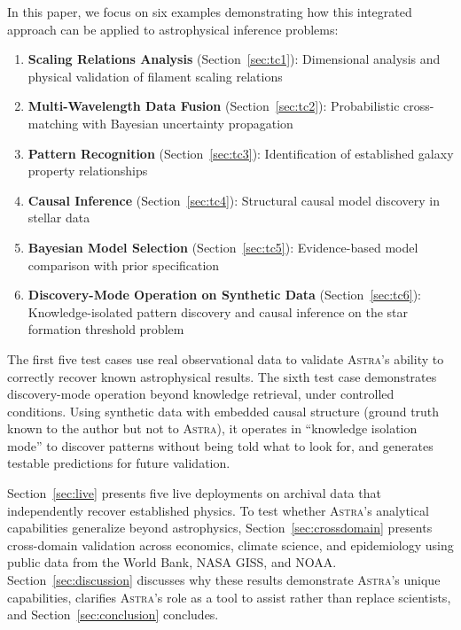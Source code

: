 \documentclass[usenatbib]{rasti}
\newcommand{\astra}{\textsc{Astra}\xspace}
\begin{document}
In this paper, we focus on six examples demonstrating how this integrated approach can be applied to astrophysical inference problems:
\begin{enumerate}
  \item[(i)] \textbf{Scaling Relations Analysis} (Section~\ref{sec:tc1}): Dimensional analysis and physical validation of filament scaling relations
  \item[(ii)] \textbf{Multi-Wavelength Data Fusion} (Section~\ref{sec:tc2}): Probabilistic cross-matching with Bayesian uncertainty propagation
  \item[(iii)] \textbf{Pattern Recognition} (Section~\ref{sec:tc3}): Identification of established galaxy property relationships
  \item[(iv)] \textbf{Causal Inference} (Section~\ref{sec:tc4}): Structural causal model discovery in stellar data
  \item[(v)] \textbf{Bayesian Model Selection} (Section~\ref{sec:tc5}): Evidence-based model comparison with prior specification
  \item[(vi)] \textbf{Discovery-Mode Operation on Synthetic Data} (Section~\ref{sec:tc6}): Knowledge-isolated pattern discovery and causal inference on the star formation threshold problem
\end{enumerate}

The first five test cases use real observational data to validate \astra's ability to correctly recover known astrophysical results.
The sixth test case demonstrates discovery-mode operation beyond knowledge retrieval, under controlled conditions.
Using synthetic data with embedded causal structure (ground truth known to the author but not to \astra), it operates in ``knowledge isolation mode'' to discover patterns without being told what to look for, and generates testable predictions for future validation.

Section~\ref{sec:live} presents five live deployments on archival data that independently recover established physics.
To test whether \astra's analytical capabilities generalize beyond astrophysics, Section~\ref{sec:crossdomain} presents cross-domain validation across economics, climate science, and epidemiology using public data from the World Bank, NASA GISS, and NOAA.
Section~\ref{sec:discussion} discusses why these results demonstrate \astra's unique capabilities, clarifies \astra's role as a tool to assist rather than replace scientists, and Section~\ref{sec:conclusion} concludes.

\end{document}
